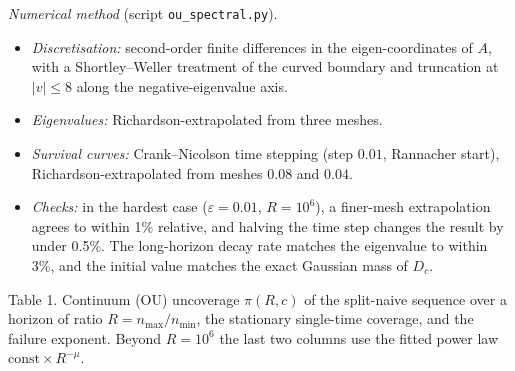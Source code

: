 \documentclass[
  10pt,
  a4paper,
]{article}
\providecommand{\tightlist}{%
  \setlength{\itemsep}{0pt}\setlength{\parskip}{0pt}}
\begin{document}
\emph{Numerical method} (script \texttt{ou\_spectral.py}).

\begin{itemize}
\tightlist
\item
  \emph{Discretisation:} second-order finite differences in the
  eigen-coordinates of \(A\), with a Shortley--Weller treatment of the
  curved boundary and truncation at \(|v|\le8\) along the
  negative-eigenvalue axis.
\item
  \emph{Eigenvalues:} Richardson-extrapolated from three meshes.
\item
  \emph{Survival curves:} Crank--Nicolson time stepping (step \(0.01\),
  Rannacher start), Richardson-extrapolated from meshes \(0.08\) and
  \(0.04\).
\item
  \emph{Checks:} in the hardest case (\(\varepsilon=0.01\), \(R=10^6\)),
  a finer-mesh extrapolation agrees to within 1\% relative, and halving
  the time step changes the result by under 0.5\%. The long-horizon
  decay rate matches the eigenvalue to within 3\%, and the initial value
  matches the exact Gaussian mass of \(D_c\).
\end{itemize}

Table 1. Continuum (OU) uncoverage \(\pi(R,c)\) of the split-naive
sequence over a horizon of ratio \(R=n_{\max}/n_{\min}\), the stationary
single-time coverage, and the failure exponent. Beyond \(R=10^6\) the
last two columns use the fitted power law
\(\mathrm{const}\times R^{-\mu}\).
\end{document}
